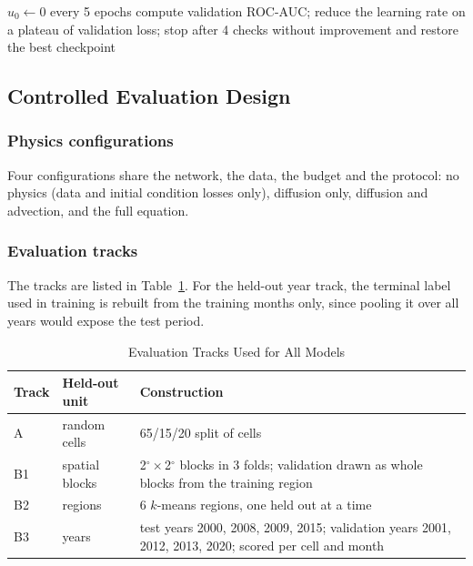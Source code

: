 \documentclass[journal]{IEEEtran}
\newcommand{\auc}{ROC-AUC}
\begin{document}
\begin{algorithm}[!t]
\caption{One training epoch of the operator}
\label{alg:train}
\small
{}
$u_0\leftarrow 0$\;
every 5 epochs compute validation \auc{}; reduce the learning rate on a plateau of validation loss; stop after 4 checks without improvement and restore the best checkpoint\;
\end{algorithm}

\subsection{Controlled Evaluation Design}
\subsubsection{Physics configurations}
Four configurations share the network, the data, the budget and the protocol: no physics (data and initial condition losses only), diffusion only, diffusion and advection, and the full equation.

\subsubsection{Evaluation tracks}
The tracks are listed in Table~\ref{tab:tracks}. For the held-out year track, the terminal label used in training is rebuilt from the training months only, since pooling it over all years would expose the test period.

\begin{table}[!t]
\caption{Evaluation Tracks Used for All Models}
\label{tab:tracks}
\centering
\footnotesize
\renewcommand{\arraystretch}{1.15}
\begin{tabular}{@{}lp{1.6cm}p{4.6cm}@{}}
\toprule
Track & Held-out unit & Construction \\
\midrule
A & random cells & 65/15/20 split of cells \\
B1 & spatial blocks & 2$^\circ\times$2$^\circ$ blocks in 3 folds; validation drawn as whole blocks from the training region \\
B2 & regions & 6 $k$-means regions, one held out at a time \\
B3 & years & test years 2000, 2008, 2009, 2015; validation years 2001, 2012, 2013, 2020; scored per cell and month \\
\bottomrule
\end{tabular}
\end{table}
\end{document}
